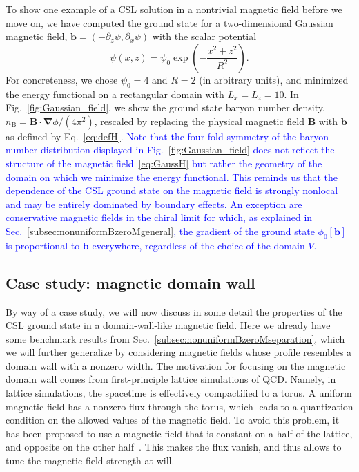 \documentclass[pdflatex,iicol,sn-mathphys-num]{sn-jnl}
\let\p=\phi
\let\de=\partial
\newcommand{\vek}[1]{\bm{#1}}%
\newcommand{\grad}{\vek\nabla}%
\newcommand{\bmag}{b}%
\begin{document}
To show one example of a CSL solution in a nontrivial magnetic field before we move on, we have computed the ground state for a two-dimensional Gaussian magnetic field, $\vek\bmag=(-\de_z\psi,\de_x\psi)$ with the scalar potential 
\begin{equation}
\psi(x,z)=\psi_0\exp\left(-\frac{x^2+z^2}{R^2}\right).
\label{eq:GaussH}
\end{equation}
For concreteness, we chose $\psi_0=4$ and $R=2$ (in arbitrary units), and minimized the energy functional on a rectangular domain with $L_x=L_z=10$. In Fig.~\ref{fig:Gaussian_field}, we show the ground state baryon number density, $n_\text{B}=\vek B\cdot\grad\p/(4\pi^2)$, rescaled by replacing the physical magnetic field $\vek B$ with $\vek\bmag$ as defined by Eq.~\eqref{eq:defH}. \textcolor{blue}{Note that the four-fold symmetry of the baryon number distribution displayed in Fig.~\ref{fig:Gaussian_field} does not reflect the structure of the magnetic field~\eqref{eq:GaussH} but rather the geometry of the domain on which we minimize the energy functional. This reminds us that the dependence of the CSL ground state on the magnetic field is strongly nonlocal and may be entirely dominated by boundary effects. An exception are conservative magnetic fields in the chiral limit for which, as explained in Sec.~\ref{subsec:nonuniformBzeroMgeneral}, the gradient of the ground state $\p_0[\vek\bmag]$ is proportional to $\vek\bmag$ everywhere, regardless of the choice of the domain $V$.}


\subsection{Case study: magnetic domain wall}
\label{subsec:nonuniformBnonzeroMdomainwall}

By way of a case study, we will now discuss in some detail the properties of the CSL ground state in a domain-wall-like magnetic field. Here we already have some benchmark results from Sec.~\ref{subsec:nonuniformBzeroMseparation}, which we will further generalize by considering magnetic fields whose profile resembles a domain wall with a nonzero width. The motivation for focusing on the magnetic domain wall comes from first-principle lattice simulations of QCD. Namely, in lattice simulations, the spacetime is effectively compactified to a torus. A uniform magnetic field has a nonzero flux through the torus, which leads to a quantization condition on the allowed values of the magnetic field. To avoid this problem, it has been proposed to use a magnetic field that is constant on a half of the lattice, and opposite on the other half~\cite{Levkova2014}. This makes the flux vanish, and thus allows to tune the magnetic field strength at will. 
\end{document}
